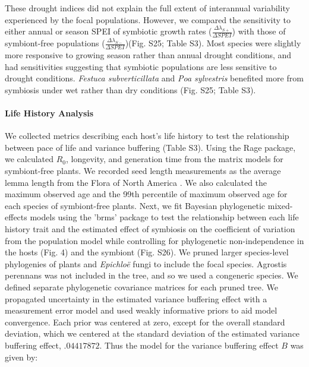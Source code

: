 \documentclass[12pt]{article}
\begin{document}
These drought indices did not explain the full extent of interannual variability experienced by the focal populations.
However, we compared the sensitivity to either annual or season SPEI of symbiotic growth rates ($\frac{\Delta\lambda_{S+}}{\Delta SPEI}$) with those of symbiont-free populations ($\frac{\Delta\lambda_{S-}}{\Delta SPEI}$)(Fig. S25; Table S3).
Most species were slightly more responsive to growing season rather than annual drought conditions, and had sensitivities suggesting that symbiotic populations are less sensitive to drought conditions. 
\emph{Festuca subverticillata} and \emph{Poa sylvestris} benefited more from symbiosis under wet rather than dry conditions (Fig. S25; Table S3).


\paragraph*{Life History Analysis}
We collected metrics describing each host's life history to test the relationship between pace of life and variance buffering (Table S3). 
Using the Rage package, we calculated $R_0$, longevity, and generation time from the matrix models for symbiont-free plants. 
We recorded seed length measurements as the average lemma length from the Flora of North America \cite{FloraNAonline}. 
We also calculated the maximum observed age and the 99th percentile of maximum observed age for each species of symbiont-free plants.
Next, we fit Bayesian phylogenetic mixed-effects models using the 'brms' package \cite{Burkner2017brms} to test the relationship between each life history trait and the estimated effect of symbiosis on the coefficient of variation from the population model while controlling for phylogenetic non-independence in the hosts (Fig. 4) and the symbiont (Fig. S26).
We pruned larger species-level phylogenies of plants\cite{zanne2014three} and \emph{Epichlo\"{e}} fungi \cite{leuchtmann2014nomenclatural} to include the focal species.
Agrostis perennans was not included in the tree, and so we used a congeneric species. 
We defined separate phylogenetic covariance matrices for each pruned tree.
We propagated uncertainty in the estimated variance buffering effect with a measurement error model and used weakly informative priors to aid model convergence.
Each prior was centered at zero, except for the overall standard deviation, which we centered at the standard deviation of the estimated variance buffering effect, $.04417872$.
Thus the model for the variance buffering effect $B$ was given by:
\end{document}
